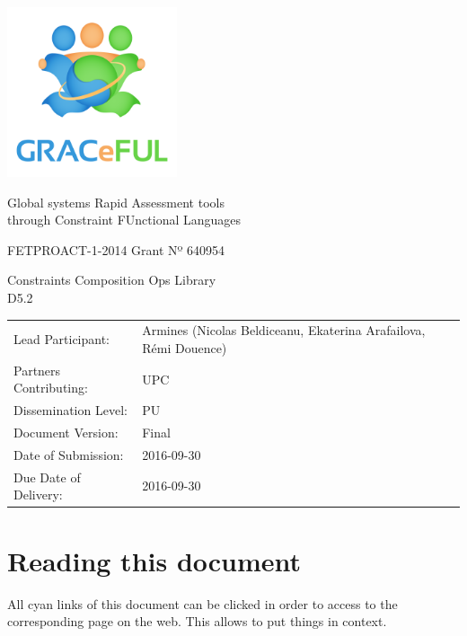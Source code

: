 \documentclass{article}
\begin{document}
\begin{center}
\includegraphics[width=5cm]{GRACeFULlogo.png}

\textcolor{GRACeFULblue}{Global systems Rapid Assessment tools\\
through Constraint FUnctional Languages}

\vspace{1cm}

FETPROACT-1-2014 Grant Nº 640954

\end{center}

\begin{framed}
\begin{center}
\Large
Constraints Composition Ops Library\\[1ex]

D5.2\\[1ex]

\end{center}
\end{framed}

\vspace{1cm}

\noindent
\begin{tabular}{@{}ll@{}}
  Lead Participant:       & Armines (Nicolas Beldiceanu, Ekaterina Arafailova, R\'emi Douence)
\\Partners Contributing:  & UPC
\\Dissemination Level:    & PU
\\Document Version:       & Final
\\Date of Submission:     & 2016-09-30
\\Due Date of Delivery:   & 2016-09-30
\end{tabular}

\clearpage
\section{Reading this document}

All cyan links of this document can be clicked in order to access
to the corresponding page on the web. This allows to put things in context.
\end{document}

